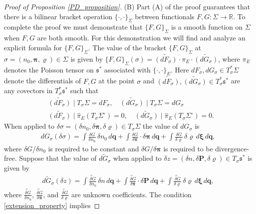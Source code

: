 \documentclass[%
 aip,
 amsmath,amssymb,
reprint, onecolumn %
]{revtex4-1}
\begin{document}
\begin{proof}[Proof of Proposition \ref{PD_proposition}]
(B) Part (A) of the proof guarantees that there is a bilinear bracket operation $\{\cdot,\cdot\}_\Sigma$ between functionals $F,G:\Sigma\rightarrow\mathbb{R}$. To complete the proof we must demonstrate that $\{F,G\}_\Sigma$ is a smooth function on $\Sigma$ when $F,G$ are both smooth. For this demonstration we will find and analyze an explicit formula for $\{F,G\}_\Sigma$. The value of the bracket $\{F,G\}_\Sigma$ at $\sigma=(n_0,\bm{\pi},\varrho)\in \Sigma$ is given by $\{F,G\}_\Sigma(\sigma) = \widetilde{(dF_\sigma)}\cdot \pi_{E}\cdot \widetilde{(dG_\sigma)}$, where $\pi_E$ denotes the Poisson tensor on $\mathfrak{s}^*$ associated with $\{\cdot,\cdot\}_E$. Here $dF_\sigma,dG_\sigma\in T^*_\sigma\Sigma$ denote the differentials of $F,G$ at the point $\sigma$ and $\widetilde{(dF_\sigma)},\widetilde{(dG_\sigma)}\in T^*_\sigma\mathfrak{s}^*$ are any covectors in $T^*_\sigma\mathfrak{s}^*$ such that
\begin{align}
&\widetilde{(dF_\sigma)}\mid T_\sigma\Sigma = dF_\sigma,\quad \widetilde{(dG_\sigma)}\mid T_\sigma\Sigma = dG_\sigma\label{extension_property}\\
&\widetilde{(dF_\sigma)}\mid \widehat{\pi}_E(T_\sigma\Sigma^\circ) = 0,\quad \widetilde{(dG_\sigma)}\mid \widehat{\pi}_E(T_\sigma\Sigma^\circ) = 0.\label{transverse_property}
\end{align}
When applied to $\delta \sigma = (\delta n_0,\delta\bm{\pi},\delta\varrho)\in T_\sigma\Sigma$ the value of $dG_\sigma$ is
\begin{align*}
dG_\sigma(\delta \sigma) = \int \frac{\delta G}{\delta n_0}\,\delta n_0\,d\bm{q} + \int \frac{\delta G}{\delta \bm{\pi}}\cdot\delta\bm{\pi}\,d\bm{q} + \int\frac{\delta G}{\delta\varrho}\,\delta\varrho\,d\bm{\xi}\,d\bm{q},
\end{align*}
where $\delta G/\delta n_0$ is required to be constant and $\delta G/\delta\bm{\pi}$ is required to be divergence-free.
Suppose that the value of $\widetilde{dG_\sigma}$ when applied to $\delta z = (\delta n,\delta \bm{P},\delta\varrho)\in T_\sigma\mathfrak{s}^*$ is given by
\begin{align*}
\widetilde{dG_\sigma}(\delta z) = \int \widetilde{\frac{\delta G}{\delta n_0}}\,\delta n\,d\bm{q} + \int \widetilde{\frac{\delta G}{\delta\bm{\pi}}}\cdot \delta\bm{P}\,d\bm{q} + \int \widetilde{\frac{\delta G}{\delta\varrho}}\,\delta\varrho\,d\bm{\xi}\,d\bm{q},
\end{align*}
where $\widetilde{\frac{\delta G}{\delta n_0}}$, $\widetilde{\frac{\delta G}{\delta\bm{\pi}}}$, and $\widetilde{\frac{\delta G}{\delta\varrho}}$ are unknown coefficients. The condition \eqref{extension_property} implies

\end{proof}
\end{document}
